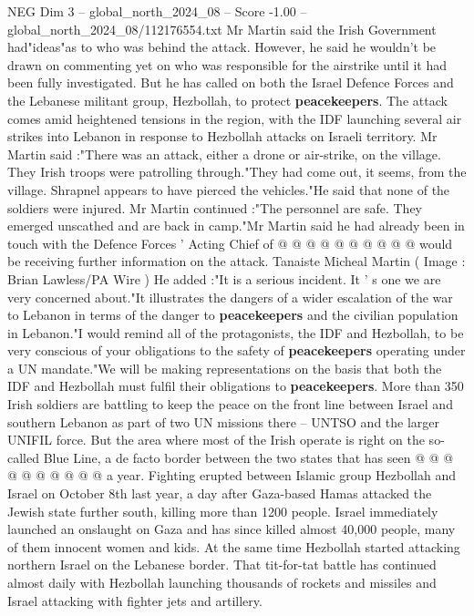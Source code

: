 \begin{textsample}{NEG Dim 3 – global\_north\_2024\_08 – Score -1.00 – global\_north\_2024\_08/112176554.txt}  \label{ex:f3_neg_312}
Mr Martin said the Irish Government had"ideas"as to who was behind the attack.
However, he said he wouldn't be drawn on commenting yet on who was responsible for the airstrike until it had been fully investigated.
But he has called on both the Israel Defence Forces and the Lebanese militant group, Hezbollah, to protect \textbf{peacekeepers}.
The attack comes amid heightened tensions in the region, with the IDF launching several air strikes into Lebanon in response to Hezbollah attacks on Israeli territory.
Mr Martin said :"There was an attack, either a drone or air-strike, on the village.
They Irish troops were patrolling through."They had come out, it seems, from the village.
Shrapnel appears to have pierced the vehicles."He said that none of the soldiers were injured.
Mr Martin continued :"The personnel are safe.
They emerged unscathed and are back in camp."Mr Martin said he had already been in touch with the Defence Forces ' Acting Chief of @ @ @ @ @ @ @ @ @ @ would be receiving further information on the attack.
Tanaiste Micheal Martin ( Image : Brian Lawless/PA Wire ) He added :"It is a serious incident.
It ' s one we are very concerned about."It illustrates the dangers of a wider escalation of the war to Lebanon in terms of the danger to \textbf{peacekeepers} and the civilian population in Lebanon."I would remind all of the protagonists, the IDF and Hezbollah, to be very conscious of your obligations to the safety of \textbf{peacekeepers} operating under a UN mandate."We will be making representations on the basis that both the IDF and Hezbollah must fulfil their obligations to \textbf{peacekeepers}.
More than 350 Irish soldiers are battling to keep the peace on the front line between Israel and southern Lebanon as part of two UN missions there -- UNTSO and the larger UNIFIL force.
But the area where most of the Irish operate is right on the so-called Blue Line, a de facto border between the two states that has seen @ @ @ @ @ @ @ @ @ @ a year.
Fighting erupted between Islamic group Hezbollah and Israel on October 8th last year, a day after Gaza-based Hamas attacked the Jewish state further south, killing more than 1200 people.
Israel immediately launched an onslaught on Gaza and has since killed almost 40,000 people, many of them innocent women and kids.
At the same time Hezbollah started attacking northern Israel on the Lebanese border.
That tit-for-tat battle has continued almost daily with Hezbollah launching thousands of rockets and missiles and Israel attacking with fighter jets and artillery.

\end{textsample}
